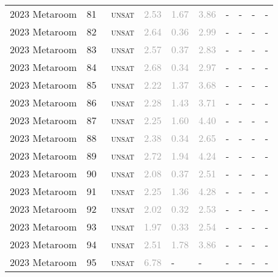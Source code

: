 \begin{center}
{\begin{longtable}{@{}llllllllll@{}}
2023 Metaroom & 81 & ~\textsc{unsat} & \textcolor{darkgray}{2.53} & \textcolor{darkgray}{1.67} & \textcolor{darkgray}{3.86} & - & - & - & - \\
2023 Metaroom & 82 & ~\textsc{unsat} & \textcolor{darkgray}{2.64} & \textcolor{darkgray}{0.36} & \textcolor{darkgray}{2.99} & - & - & - & - \\
2023 Metaroom & 83 & ~\textsc{unsat} & \textcolor{darkgray}{2.57} & \textcolor{darkgray}{0.37} & \textcolor{darkgray}{2.83} & - & - & - & - \\
2023 Metaroom & 84 & ~\textsc{unsat} & \textcolor{darkgray}{2.68} & \textcolor{darkgray}{0.34} & \textcolor{darkgray}{2.97} & - & - & - & - \\
2023 Metaroom & 85 & ~\textsc{unsat} & \textcolor{darkgray}{2.22} & \textcolor{darkgray}{1.37} & \textcolor{darkgray}{3.68} & - & - & - & - \\
2023 Metaroom & 86 & ~\textsc{unsat} & \textcolor{darkgray}{2.28} & \textcolor{darkgray}{1.43} & \textcolor{darkgray}{3.71} & - & - & - & - \\
2023 Metaroom & 87 & ~\textsc{unsat} & \textcolor{darkgray}{2.25} & \textcolor{darkgray}{1.60} & \textcolor{darkgray}{4.40} & - & - & - & - \\
2023 Metaroom & 88 & ~\textsc{unsat} & \textcolor{darkgray}{2.38} & \textcolor{darkgray}{0.34} & \textcolor{darkgray}{2.65} & - & - & - & - \\
2023 Metaroom & 89 & ~\textsc{unsat} & \textcolor{darkgray}{2.72} & \textcolor{darkgray}{1.94} & \textcolor{darkgray}{4.24} & - & - & - & - \\
2023 Metaroom & 90 & ~\textsc{unsat} & \textcolor{darkgray}{2.08} & \textcolor{darkgray}{0.37} & \textcolor{darkgray}{2.51} & - & - & - & - \\
2023 Metaroom & 91 & ~\textsc{unsat} & \textcolor{darkgray}{2.25} & \textcolor{darkgray}{1.36} & \textcolor{darkgray}{4.28} & - & - & - & - \\
2023 Metaroom & 92 & ~\textsc{unsat} & \textcolor{darkgray}{2.02} & \textcolor{darkgray}{0.32} & \textcolor{darkgray}{2.53} & - & - & - & - \\
2023 Metaroom & 93 & ~\textsc{unsat} & \textcolor{darkgray}{1.97} & \textcolor{darkgray}{0.33} & \textcolor{darkgray}{2.54} & - & - & - & - \\
2023 Metaroom & 94 & ~\textsc{unsat} & \textcolor{darkgray}{2.51} & \textcolor{darkgray}{1.78} & \textcolor{darkgray}{3.86} & - & - & - & - \\
2023 Metaroom & 95 & ~\textsc{unsat} & \textcolor{darkgray}{6.78} & - & - & - & - & - & - \\

\end{longtable}}
\end{center}
